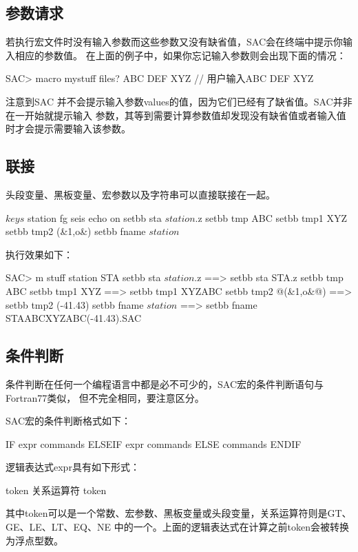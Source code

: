 \subsection{参数请求}
若执行宏文件时没有输入参数而这些参数又没有缺省值，SAC会在终端中提示你输入相应的参数值。
在上面的例子中，如果你忘记输入参数则会出现下面的情况：
\begin{SACCode}
SAC> macro mystuff
files? ABC DEF XYZ          // 用户输入ABC DEF XYZ
\end{SACCode}
注意到SAC 并不会提示输入参数values的值，因为它们已经有了缺省值。SAC并非在一开始就提示输入
参数，其等到需要计算参数值却发现没有缺省值或者输入值时才会提示需要输入该参数。

\subsection{联接}
头段变量、黑板变量、宏参数以及字符串可以直接联接在一起。

\begin{SACCode}
$keys$ station
fg seis
echo on
setbb sta $station$.z
setbb tmp ABC
setbb tmp1 XYZ%
setbb tmp2 (&1,o&)
setbb fname $station$%
\end{SACCode}

执行效果如下：
\begin{SACCode}
SAC> m stuff station STA
 setbb sta $station$.z
 ==>  setbb sta STA.z
 setbb tmp ABC
 setbb tmp1 XYZ%
 ==>  setbb tmp1 XYZABC
 setbb tmp2 @(&1,o&@)
 ==>  setbb tmp2 (-41.43)
 setbb fname $station$%
 ==>  setbb fname STAABCXYZABC(-41.43).SAC
\end{SACCode}

\subsection{条件判断}
条件判断在任何一个编程语言中都是必不可少的，SAC宏的条件判断语句与Fortran77类似，
但不完全相同，要注意区分。

SAC宏的条件判断格式如下：
\begin{SACCode}
  IF expr
  	commands
  ELSEIF expr
  	commands
  ELSE
  	commands
  ENDIF
\end{SACCode}

逻辑表达式expr具有如下形式：
\begin{SACCode}
    token 关系运算符 token
\end{SACCode}
其中token可以是一个常数、宏参数、黑板变量或头段变量，关系运算符则是GT、GE、LE、LT、EQ、NE
中的一个。上面的逻辑表达式在计算之前token会被转换为浮点型数。

